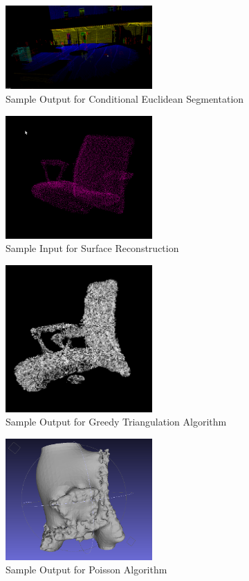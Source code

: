 \begin{figure}[h]
	\includegraphics[width=0.5\textwidth]{./figure/statueAfter.png}
	\caption{Sample Output for Conditional Euclidean Segmentation}
	\label{fig:euclidean output}
\end{figure}

\begin{figure}[h]
	\includegraphics[width=0.5\textwidth]{./figure/pointChair.png}
	\caption{Sample Input for Surface Reconstruction}
	\label{fig:Chair Point Cloud}
\end{figure}


\begin{figure}[h]
	\includegraphics[width=0.5\textwidth]{./figure/meshChair.png}
	\caption{Sample Output for Greedy Triangulation Algorithm}
	\label{fig:greedy output}
\end{figure}

\begin{figure}[h]
	\includegraphics[width=0.5\textwidth]{./figure/poissonChair.png}
	\caption{Sample Output for Poisson Algorithm}
	\label{fig:poisson output}
\end{figure}